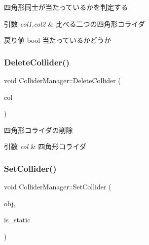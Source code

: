 四角形同士が当たっているかを判定する 


\begin{DoxyParams}{引数}
{\em col1,col2} & 比べる二つの四角形コライダ \\
\hline
\end{DoxyParams}
\begin{DoxyReturn}{戻り値}
bool 当たっているかどうか 
\end{DoxyReturn}
\mbox{\label{class_collider_manager_afb805cdb8c6e5872d54ecbb9368ba38d}} 
\subsubsection{\texorpdfstring{Delete\+Collider()}{DeleteCollider()}}
{\footnotesize\ttfamily void Collider\+Manager\+::\+Delete\+Collider (\begin{DoxyParamCaption}\item[{\mbox{\hyperlink{class_square_collider}{Square\+Collider}} $\ast$}]{col }\end{DoxyParamCaption})}



四角形コライダの削除 


\begin{DoxyParams}{引数}
{\em col} & 四角形コライダ \\
\hline
\end{DoxyParams}
\mbox{\label{class_collider_manager_acf6822be802b18cd2f0ea50b2ba00d63}} 
\subsubsection{\texorpdfstring{Set\+Collider()}{SetCollider()}}
{\footnotesize\ttfamily void Collider\+Manager\+::\+Set\+Collider (\begin{DoxyParamCaption}\item[{\mbox{\hyperlink{class_square_collider}{Square\+Collider}} $\ast$}]{obj,  }\item[{bool}]{is\+\_\+static }\end{DoxyParamCaption})}



